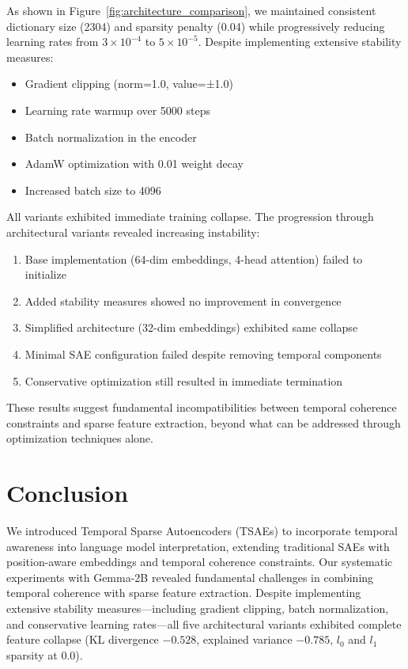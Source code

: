 As shown in Figure~\ref{fig:architecture_comparison}, we maintained consistent dictionary size (2304) and sparsity penalty (0.04) while progressively reducing learning rates from $3\times10^{-4}$ to $5\times10^{-5}$. Despite implementing extensive stability measures:

\begin{itemize}
\item Gradient clipping (norm=1.0, value=±1.0)
\item Learning rate warmup over 5000 steps
\item Batch normalization in the encoder
\item AdamW optimization with 0.01 weight decay
\item Increased batch size to 4096
\end{itemize}

All variants exhibited immediate training collapse. The progression through architectural variants revealed increasing instability:

\begin{enumerate}
\item Base implementation (64-dim embeddings, 4-head attention) failed to initialize
\item Added stability measures showed no improvement in convergence
\item Simplified architecture (32-dim embeddings) exhibited same collapse
\item Minimal SAE configuration failed despite removing temporal components
\item Conservative optimization still resulted in immediate termination
\end{enumerate}

These results suggest fundamental incompatibilities between temporal coherence constraints and sparse feature extraction, beyond what can be addressed through optimization techniques alone.

\section{Conclusion}
We introduced Temporal Sparse Autoencoders (TSAEs) to incorporate temporal awareness into language model interpretation, extending traditional SAEs with position-aware embeddings and temporal coherence constraints. Our systematic experiments with Gemma-2B revealed fundamental challenges in combining temporal coherence with sparse feature extraction. Despite implementing extensive stability measures—including gradient clipping, batch normalization, and conservative learning rates—all five architectural variants exhibited complete feature collapse (KL divergence $-0.528$, explained variance $-0.785$, $l_0$ and $l_1$ sparsity at 0.0).

